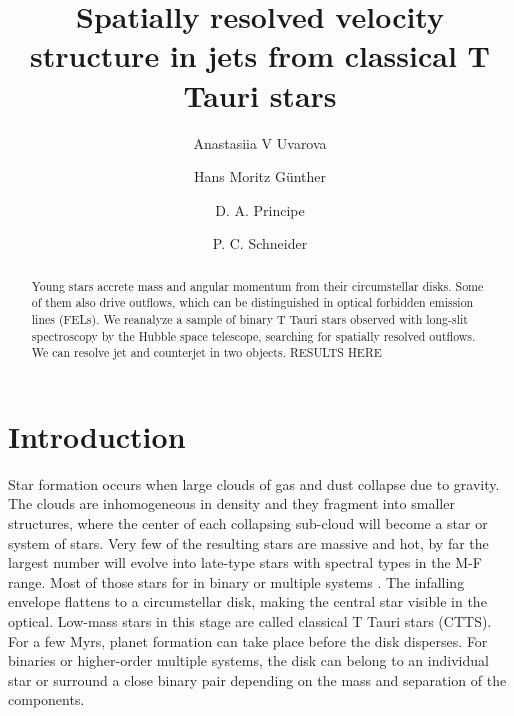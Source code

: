 \documentclass[twocolumn]{aastex62}
\begin{document}
\title{Spatially resolved velocity structure in jets from classical T Tauri stars}



\author{Anastasiia V Uvarova}

\author[0000-0003-4243-2840]{Hans Moritz G\"unther}

\author{D. A. Principe}

\author{P. C. Schneider}

\begin{abstract}
Young stars accrete mass and angular momentum from their circumstellar
disks. Some of them also drive outflows, which can be distinguished in
optical forbidden emission lines (FELs). We reanalyze a sample of binary
T Tauri stars observed with long-slit spectroscopy by the Hubble space
telescope, searching for spatially resolved outflows. We can resolve jet
and counterjet in two objects. RESULTS HERE%
\end{abstract}%




\section{Introduction}

Star formation occurs when large clouds of gas and dust collapse due to
gravity. The clouds are inhomogeneous in density and they fragment into
smaller structures, where the center of each collapsing sub-cloud will
become a star or system of stars. Very few of the resulting stars are
massive and hot, by far the largest number will evolve into late-type
stars with spectral types in the M-F range. Most of those stars for in binary or multiple systems \citep[see e.g.\ review by][]{2007prpl.conf..379D}.
The infalling envelope
flattens to a circumstellar disk, making the central star visible in the
optical. Low-mass stars in this stage are called classical T Tauri stars
(CTTS). For a few Myrs, planet formation can take place before the disk
disperses. For binaries or higher-order multiple systems, the disk can
belong to an individual star or surround a close binary pair depending
on the mass and separation of the components.
\end{document}

